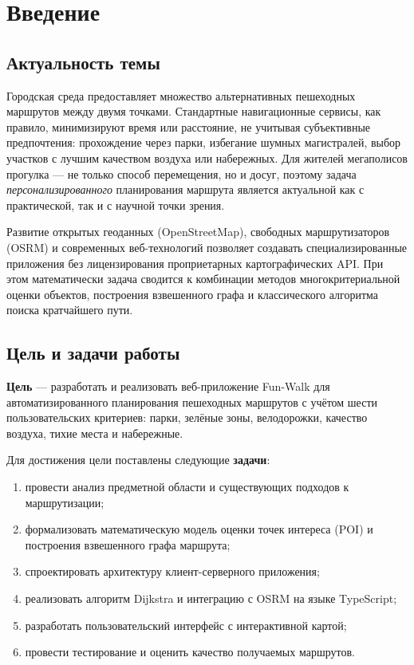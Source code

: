 \chapter{Введение}
\label{ch:intro}

\section{Актуальность темы}

Городская среда предоставляет множество альтернативных пешеходных маршрутов между
двумя точками. Стандартные навигационные сервисы, как правило, минимизируют время
или расстояние, не учитывая субъективные предпочтения: прохождение через парки,
избегание шумных магистралей, выбор участков с лучшим качеством воздуха или
набережных. Для жителей мегаполисов прогулка --- не только способ перемещения, но
и досуг, поэтому задача \emph{персонализированного} планирования маршрута является
актуальной как с практической, так и с научной точки зрения.

Развитие открытых геоданных (OpenStreetMap), свободных маршрутизаторов (OSRM) и
современных веб-технологий позволяет создавать специализированные приложения без
лицензирования проприетарных картографических API. При этом математически задача
сводится к комбинации методов многокритериальной оценки объектов, построения
взвешенного графа и классического алгоритма поиска кратчайшего пути.

\section{Цель и задачи работы}

\textbf{Цель} --- разработать и реализовать веб-приложение Fun-Walk для
автоматизированного планирования пешеходных маршрутов с учётом шести
пользовательских критериев: парки, зелёные зоны, велодорожки, качество воздуха,
тихие места и набережные.

Для достижения цели поставлены следующие \textbf{задачи}:
\begin{enumerate}
  \item провести анализ предметной области и существующих подходов к маршрутизации;
  \item формализовать математическую модель оценки точек интереса (POI) и построения
        взвешенного графа маршрута;
  \item спроектировать архитектуру клиент-серверного приложения;
  \item реализовать алгоритм Dijkstra и интеграцию с OSRM на языке TypeScript;
  \item разработать пользовательский интерфейс с интерактивной картой;
  \item провести тестирование и оценить качество получаемых маршрутов.
\end{enumerate}

